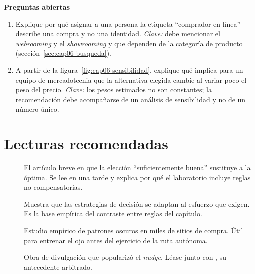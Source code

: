 \textbf{Preguntas abiertas}

\begin{enumerate}
  \item Explique por qué asignar a una persona la etiqueta \enquote{comprador
  en línea} describe una compra y no una identidad. \textit{Clave:} debe
  mencionar el \textit{webrooming} y el \textit{showrooming} y que dependen de
  la categoría de producto (sección~\ref{sec:cap06-busqueda}).
  \item A partir de la figura~\ref{fig:cap06-sensibilidad}, explique qué
  implica para un equipo de mercadotecnia que la alternativa elegida cambie
  al variar poco el peso del precio. \textit{Clave:} los pesos estimados no
  son constantes; la recomendación debe acompañarse de un análisis de
  sensibilidad y no de un número único.
\end{enumerate}

\section{Lecturas recomendadas}

\begin{description}
  \item[\textcite{simon1955}] El artículo breve en que la elección \enquote{suficientemente buena} sustituye a la óptima. Se lee en una tarde y explica por qué el laboratorio incluye reglas no compensatorias.
  \item[\textcite{payne1988adaptive}] Muestra que las estrategias de decisión se adaptan al esfuerzo que exigen. Es la base empírica del contraste entre reglas del capítulo.
  \item[\textcite{mathur2019}] Estudio empírico de patrones oscuros en miles de sitios de compra. Útil para entrenar el ojo antes del ejercicio de la ruta autónoma.
  \item[\textcite{thalersunstein2008}] Obra de divulgación que popularizó el \textit{nudge}. Léase junto con \textcite{thaler2003libertarian}, su antecedente arbitrado.
\end{description}
